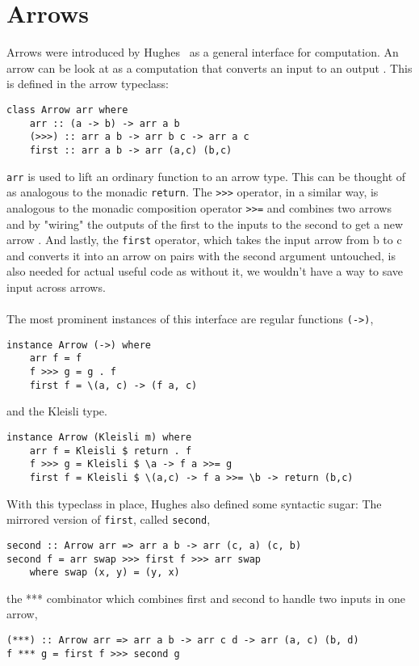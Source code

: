 \section{Arrows}
Arrows were introduced by Hughes \citHughes ~as a general interface for computation. An arrow  can be look at as a computation that converts an input  to an output . This is defined in the arrow typeclass:
\begin{lstlisting}[frame=htrbl]
class Arrow arr where
	arr :: (a -> b) -> arr a b
	(>>>) :: arr a b -> arr b c -> arr a c
	first :: arr a b -> arr (a,c) (b,c)
\end{lstlisting}
\lstinline{arr} is used to lift an ordinary function to an arrow type. This can be thought of as analogous to the monadic \lstinline{return}. The \lstinline{>>>} operator, in a similar way, is analogous to the monadic composition operator \lstinline{>>=} and combines two arrows  and  by "wiring" the outputs of the first to the inputs to the second to get a new arrow . And lastly, the \lstinline{first} operator, which takes the input arrow from b to c and converts it into an arrow on pairs with the second argument untouched, is also needed for actual useful code as without it, we wouldn't have a way to save input across arrows.
\\\\
The most prominent instances of this interface are regular functions \lstinline{(->)},
\begin{lstlisting}[frame=htrbl]
instance Arrow (->) where
	arr f = f
	f >>> g = g . f
	first f = \(a, c) -> (f a, c) 
\end{lstlisting}
and the Kleisli type.
\begin{lstlisting}[frame=htrbl]
instance Arrow (Kleisli m) where
	arr f = Kleisli $ return . f
	f >>> g = Kleisli $ \a -> f a >>= g
	first f = Kleisli $ \(a,c) -> f a >>= \b -> return (b,c)
\end{lstlisting}
With this typeclass in place, Hughes also defined some syntactic sugar: The mirrored version of \lstinline{first}, called \lstinline{second},
\begin{lstlisting}[frame=htrbl]
second :: Arrow arr => arr a b -> arr (c, a) (c, b)
second f = arr swap >>> first f >>> arr swap
	where swap (x, y) = (y, x)
\end{lstlisting}
the *** combinator which combines first and second to handle two inputs in one arrow,
\begin{lstlisting}[frame=htrbl]
(***) :: Arrow arr => arr a b -> arr c d -> arr (a, c) (b, d)
f *** g = first f >>> second g
\end{lstlisting}
